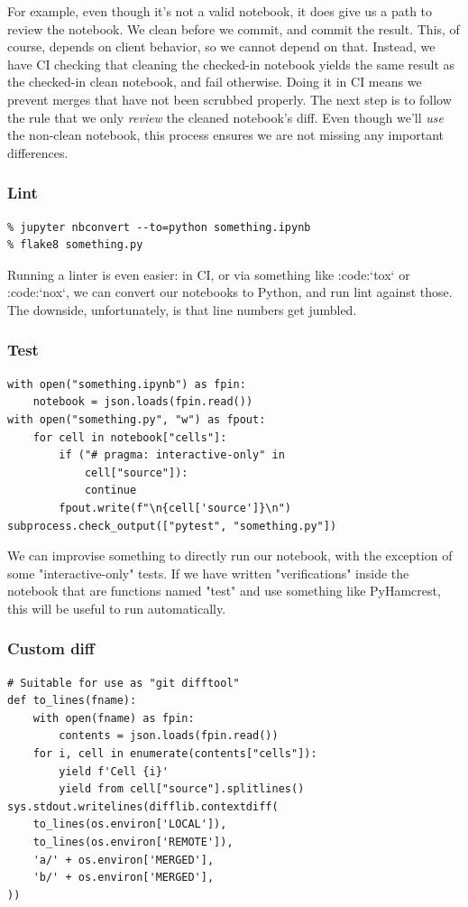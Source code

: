 For example,
even though it's not a valid notebook,
it does give us a path to review the notebook.
We clean before we commit,
and commit the result.
This,
of course,
depends on client behavior,
so we cannot depend on that.
Instead,
we have CI checking that cleaning the checked-in notebook
yields the same result as the checked-in clean notebook,
and fail otherwise.
Doing it in CI means we prevent merges that have not been scrubbed
properly.
The next step is to follow the rule that we only {\em review}
the cleaned notebook's diff.
Even though we'll {\em use} the non-clean notebook,
this process ensures we are not missing any important
differences.

\begin{frame}[fragile]

\frametitle{Lint}

\begin{lstlisting}
% jupyter nbconvert --to=python something.ipynb
% flake8 something.py
\end{lstlisting}

\end{frame}

Running a linter is even easier:
in CI,
or via something like :code:`tox`
or :code:`nox`,
we can convert our notebooks to Python,
and run lint against those.
The downside,
unfortunately,
is that line numbers get jumbled.

\begin{frame}[fragile]
\frametitle{Test}

\begin{lstlisting}
with open("something.ipynb") as fpin:
    notebook = json.loads(fpin.read())
with open("something.py", "w") as fpout:
    for cell in notebook["cells"]:
        if ("# pragma: interactive-only" in
            cell["source"]):
            continue
        fpout.write(f"\n{cell['source']}\n")
subprocess.check_output(["pytest", "something.py"])
\end{lstlisting}

\end{frame}

We can improvise something to directly run our notebook,
with the exception of some "interactive-only"
tests.
If we have written "verifications" inside the notebook
that are functions named "test" and use something like
PyHamcrest,
this will be useful to run automatically.


\begin{frame}[fragile]
\frametitle{Custom diff}

\begin{lstlisting}
# Suitable for use as "git difftool"
def to_lines(fname):
    with open(fname) as fpin:
        contents = json.loads(fpin.read())
    for i, cell in enumerate(contents["cells"]):
        yield f'Cell {i}'
        yield from cell["source"].splitlines()
sys.stdout.writelines(difflib.contextdiff(
    to_lines(os.environ['LOCAL']),
    to_lines(os.environ['REMOTE']),
    'a/' + os.environ['MERGED'],
    'b/' + os.environ['MERGED'],
))
\end{lstlisting}

\end{frame}


